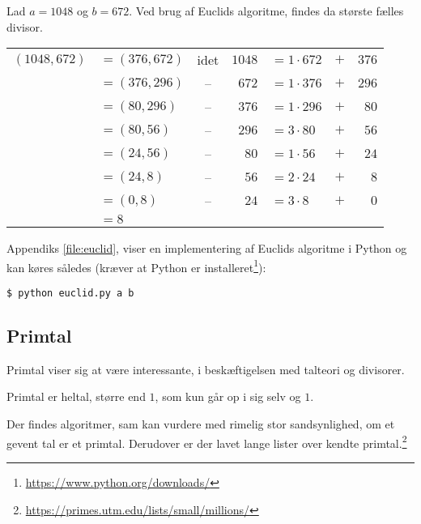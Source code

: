 \begin{eks}
    Lad \(a = 1048\) og \(b = 672\).
    Ved brug af Euclids algoritme, findes da største fælles divisor.
    \begin{center}
        \setlength{\tabcolsep}{5pt} %
        \begin{tabular}{r l c r l c r}
            \((1048, 672)\) & \(= (376, 672)\) & idet & \(1048\) & \(= 1 \cdot 672\) & \(+\) & \(376\)\\
                            & \(= (376, 296)\) & --   & \(672\) & \(= 1 \cdot 376\)  & \(+\) & \(296\)\\
                            & \(= (80, 296)\)  & --   & \(376\) & \(= 1 \cdot 296\)  & \(+\) & \(80\)\\
                            & \(= (80, 56)\)   & --   & \(296\) & \(= 3 \cdot 80\)   & \(+\) & \(56\)\\
                            & \(= (24, 56)\)   & --   & \(80\)  & \(= 1 \cdot 56\)   & \(+\) & \(24\)\\
                            & \(= (24, 8)\)    & --   & \(56\)  & \(= 2 \cdot 24\)   & \(+\) & \(8\)\\
                            & \(= (0, 8)\)     & --   & \(24\)  & \(= 3 \cdot 8\)    & \(+\) & \(0\)\\
                            & \(= 8\) & & & & &
        \end{tabular}
    \end{center}
\end{eks}
Appendiks \ref{file:euclid}, viser en implementering af Euclids algoritme i Python og kan køres således
(kræver at Python er installeret\footnote{\url{https://www.python.org/downloads/}}):
\begin{verbatim}
$ python euclid.py a b
\end{verbatim}


\subsection{Primtal}
Primtal viser sig at være interessante, i beskæftigelsen med talteori og divisorer.

\begin{definition}[Primtal]
    Primtal er heltal, større end \(1\), som kun går op i sig selv og \(1\).
\end{definition}

Der findes algoritmer, sam kan vurdere med rimelig stor sandsynlighed, om et gevent tal er et primtal.
Derudover er der lavet lange lister over kendte primtal.\footnote{\url{https://primes.utm.edu/lists/small/millions/}}


